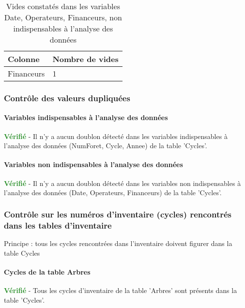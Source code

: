 \documentclass[a4paper]{article}
\begin{document}
\begin{table}[ht]
\centering
\begingroup\scriptsize
\begin{tabular}{|M{2cm}|M{1cm}|}
  \hline
Colonne & Nombre de vides \\ 
  \hline
Financeurs & 1 \\ 
   \hline
\end{tabular}
\endgroup
\caption{\footnotesize{Vides constatés dans les variables Date, Operateurs, Financeurs, non indispensables à l'analyse des données}} 
\label{Cycles-missing_values_for_non_essential_vars}
\end{table}
\FloatBarrier
\subsubsection{Contrôle des valeurs dupliquées}
\paragraph{Variables indispensables à l'analyse des données}
\textcolor{ForestGreen}{\textbf{Vérifié}} - Il n'y a aucun doublon détecté dans les variables indispensables à l'analyse des données (NumForet, Cycle, Annee) de la table 'Cycles'. \\ 

\paragraph{Variables non indispensables à l'analyse des données}
\textcolor{ForestGreen}{\textbf{Vérifié}} - Il n'y a aucun doublon détecté dans les variables non indispensables à l'analyse des données (Date, Operateurs, Financeurs) de la table 'Cycles'. \\ 

\subsubsection{Contrôle sur les numéros d'inventaire (cycles) rencontrés dans les tables d'inventaire}
Principe : tous les cycles rencontrées dans l'inventaire doivent figurer dans la table Cycles\\ 
\paragraph{Cycles de la table Arbres}
\textcolor{ForestGreen}{\textbf{Vérifié}} - Tous les cycles d'inventaire de la table 'Arbres' sont présents dans la table 'Cycles'. \\ 
\end{document}
